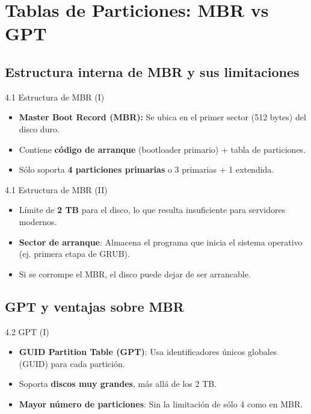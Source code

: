 \documentclass{beamer}
\begin{document}
\section{Tablas de Particiones: MBR vs GPT}

\subsection{Estructura interna de MBR y sus limitaciones}
\begin{frame}{4.1 Estructura de MBR (I)}
    \begin{itemize}
        \item \textbf{Master Boot Record (MBR):} Se ubica en el primer sector (512 bytes) del disco duro.
        \item Contiene \textbf{código de arranque} (bootloader primario) + tabla de particiones.
        \item Sólo soporta \textbf{4 particiones primarias} o 3 primarias + 1 extendida.
    \end{itemize}
\end{frame}

\begin{frame}{4.1 Estructura de MBR (II)}
    \begin{itemize}
        \item Límite de \textbf{2 TB} para el disco, lo que resulta insuficiente para servidores modernos.
        \item \textbf{Sector de arranque}: Almacena el programa que inicia el sistema operativo (ej. primera etapa de GRUB).
        \item Si se corrompe el MBR, el disco puede dejar de ser arrancable.
    \end{itemize}
\end{frame}

\subsection{GPT y ventajas sobre MBR}
\begin{frame}{4.2 GPT (I)}
    \begin{itemize}
        \item \textbf{GUID Partition Table (GPT)}: Usa identificadores únicos globales (GUID) para cada partición.
        \item Soporta \textbf{discos muy grandes}, más allá de los 2 TB.
        \item \textbf{Mayor número de particiones}: Sin la limitación de sólo 4 como en MBR.
    \end{itemize}
\end{frame}
\end{document}
